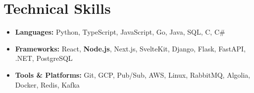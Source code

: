 \documentclass[letterpaper,11pt]{article}
\newcommand{\resumeItemThin}[1]{
  \item{
    {#1 \vspace{-5pt}}
  }
}
\newcommand{\resumeItemListStart}{\vspace{3pt}\begin{itemize}[leftmargin=0.15in, rightmargin=0.15in]}
\newcommand{\resumeItemListEnd}{\end{itemize}\vspace{-5pt}}
\begin{document}
\section{Technical Skills}
\resumeItemListStart
\resumeItemThin{\textbf{Languages: }{Python, TypeScript, JavaScript, Go, Java, SQL, C, C\#}}\\
\resumeItemThin{\textbf{Frameworks: } React, \textbf{Node.js}, Next.js, SvelteKit, Django, Flask, FastAPI, .NET, PostgreSQL}\\
\resumeItemThin{\textbf{Tools \& Platforms: }{Git, GCP, Pub/Sub, AWS, Linux, RabbitMQ, Algolia, Docker, Redis, Kafka}}\\
\resumeItemListEnd
\end{document}
